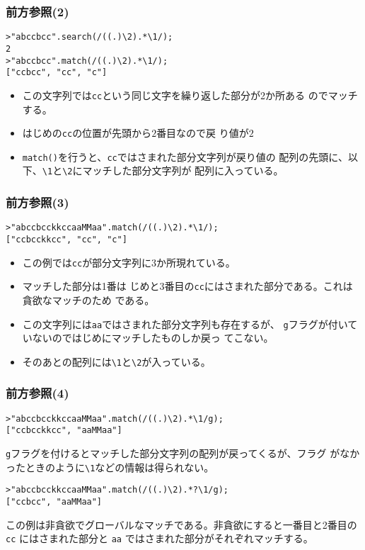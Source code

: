\begin{frame}[containsverbatim]
 \frametitle{前方参照(2)}
\begin{Verbatim}
>"abccbcc".search(/((.)\2).*\1/);
2
>"abccbcc".match(/((.)\2).*\1/);
["ccbcc", "cc", "c"]
\end{Verbatim}
\begin{itemize}
 \item この文字列では\Verb+cc+という同じ文字を繰り返した部分が2か所ある
       のでマッチする。
 \item はじめの\Verb+cc+の位置が先頭から$2$番目なので戻
       り値が$2$
 \item \Verb+match()+を行うと、\Verb+cc+ではさまれた部分文字列が戻り値の
       配列の先頭に、以下、\Verb+\1+と\Verb+\2+にマッチした部分文字列が
       配列に入っている。
\end{itemize}
\end{frame}
\begin{frame}[containsverbatim]
 \frametitle{前方参照(3)}
\begin{Verbatim}
>"abccbcckkccaaMMaa".match(/((.)\2).*\1/);
["ccbcckkcc", "cc", "c"]
\end{Verbatim}
\begin{itemize}
 \item この例では\Verb+cc+が部分文字列に3か所現れている。
 \item マッチした部分は1番は
 じめと3番目の\Verb+cc+にはさまれた部分である。これは貪欲なマッチのため
       である。
 \item この文字列には\Verb+aa+ではさまれた部分文字列も存在するが、
       \Verb+g+フラグが付いていないのではじめにマッチしたものしか戻っ
       てこない。
 \item そのあとの配列には\Verb+\1+と\Verb+\2+が入っている。
\end{itemize}
\end{frame}
\begin{frame}[containsverbatim]
 \frametitle{前方参照(4)}
\begin{Verbatim}
>"abccbcckkccaaMMaa".match(/((.)\2).*\1/g);
["ccbcckkcc", "aaMMaa"]
\end{Verbatim}
\Verb+g+フラグを付けるとマッチした部分文字列の配列が戻ってくるが、フラグ
 がなかったときのように\Verb+\1+などの情報は得られない。
\begin{Verbatim}
>"abccbcckkccaaMMaa".match(/((.)\2).*?\1/g);
["ccbcc", "aaMMaa"]
\end{Verbatim}
この例は非貪欲でグローバルなマッチである。非貪欲にすると一番目と2番目の
 \Verb+cc+ にはさまれた部分と \Verb+aa+ ではさまれた部分がそれぞれマッチする。
\end{frame}
